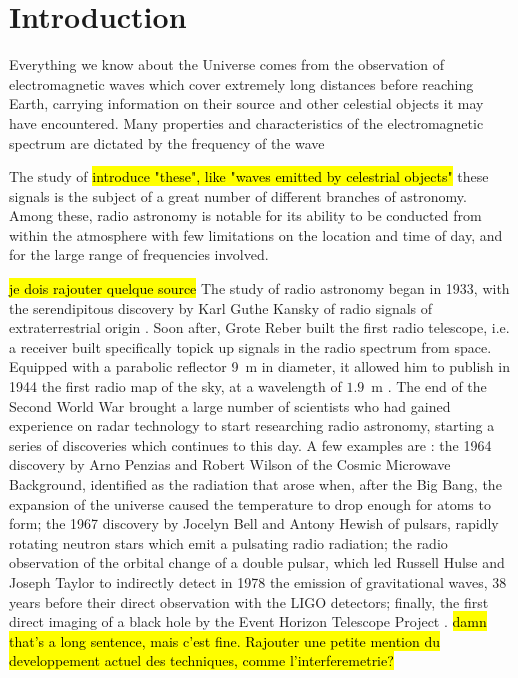 \section{Introduction}
Everything we know about the Universe comes from the observation of electromagnetic waves which cover extremely long distances before {reaching Earth}, carrying information on their source and other celestial objects it may have encountered.
{Many properties and characteristics of the electromagnetic spectrum are dictated by the frequency of the wave}

The study of \hl{introduce "these", like "waves emitted by celestrial objects"} these signals is the subject of a great number of different branches of astronomy. Among these, radio astronomy is notable {for its ability to be conducted} from within the atmosphere with few limitations on the location and time of day, and for the large range of frequencies involved.

\hl{je dois rajouter quelque source} The study of radio astronomy began in 1933, with the serendipitous discovery by Karl Guthe Kansky of radio signals of extraterrestrial origin \cite{condon_essential_2016}. 
Soon after, Grote Reber built the first radio telescope, i.e. a {receiver} built specifically to{pick up} signals in the radio spectrum from space. Equipped with a parabolic reflector \mbox{9 m} in diameter, it allowed him to publish in 1944 the first radio map of the sky, at a wavelength of \mbox{$1.9$ m} \cite{lauterbach_radio_2022}.
The end of the Second World War brought a large number of scientists who had gained experience on radar technology to start researching radio astronomy, starting a series of discoveries which continues to this day.
A few examples are \cite{lauterbach_radio_2022}: 
the 1964 discovery by Arno Penzias and Robert Wilson of the Cosmic Microwave Background, identified as the radiation that arose when, after the Big Bang, the expansion of the universe caused the temperature to drop enough for atoms to form;
the 1967 discovery by Jocelyn Bell and Antony Hewish of pulsars, rapidly rotating neutron stars which emit a pulsating radio radiation; 
the radio observation of the orbital change of a double pulsar, which led Russell Hulse and Joseph Taylor to indirectly detect in 1978 the emission of gravitational waves, 38 years before their direct observation with the LIGO detectors;
finally, the first direct imaging of a black hole by the Event Horizon Telescope Project \cite{the_event_horizon_telescope_collaboration_first_2019}.
\hl{damn that's a long sentence, mais c'est fine. Rajouter une petite mention du developpement actuel des techniques, comme l'interferemetrie?}

